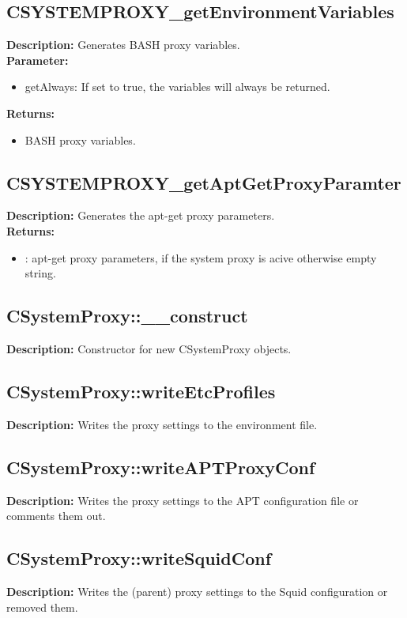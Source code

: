 \subsection{CSYSTEMPROXY\_getEnvironmentVariables}
\textbf{Description:} Generates BASH proxy variables.\\
\textbf{Parameter:}
\begin{itemize}
\item getAlways: If set to true, the variables will always be returned.
\end{itemize}
\textbf{Returns:}
\begin{itemize}
\item BASH proxy variables.
\end{itemize}

\subsection{CSYSTEMPROXY\_getAptGetProxyParamter}
\textbf{Description:} Generates the apt-get proxy parameters.\\
\textbf{Returns:}
\begin{itemize}
\item : apt-get proxy parameters, if the system proxy is acive otherwise empty string.
\end{itemize}

\subsection{CSystemProxy::\_\_construct}
\textbf{Description:} Constructor for new CSystemProxy objects.\\

\subsection{CSystemProxy::writeEtcProfiles}
\textbf{Description:} Writes the proxy settings to the environment file.\\

\subsection{CSystemProxy::writeAPTProxyConf}
\textbf{Description:} Writes the proxy settings to the APT configuration file or comments them out.\\

\subsection{CSystemProxy::writeSquidConf}
\textbf{Description:} Writes the (parent) proxy settings to the Squid configuration or removed them.\\

